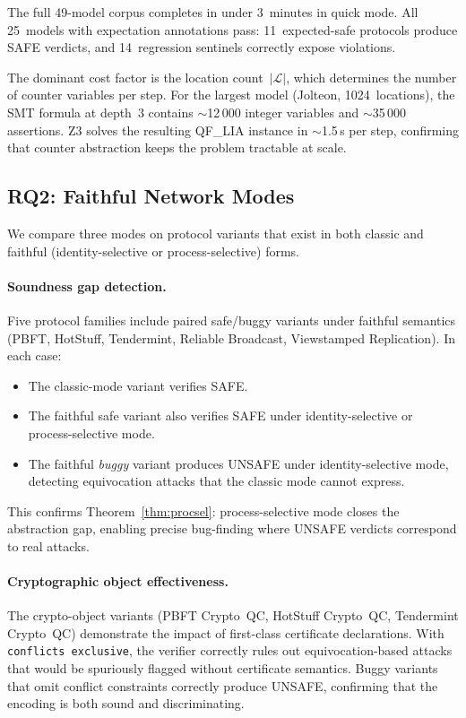The full 49-model corpus completes in under 3~minutes in quick mode.
All 25~models with expectation annotations pass: 11~expected-safe
protocols produce SAFE verdicts, and 14~regression sentinels correctly
expose violations.

The dominant cost factor is the location count~$|\mathcal{L}|$, which
determines the number of counter variables per step.  For the largest
model (Jolteon, 1024~locations), the SMT formula at depth~3 contains
${\sim}$12\,000 integer variables and ${\sim}$35\,000 assertions.
Z3 solves the resulting QF\_LIA instance in ${\sim}$1.5\,s per step,
confirming that counter abstraction keeps the problem tractable at
scale.

\subsection{RQ2: Faithful Network Modes}

We compare three modes on protocol variants that exist in both
classic and faithful (identity-selective or process-selective) forms.

\paragraph{Soundness gap detection.}
Five protocol families include paired safe/buggy variants under
faithful semantics (PBFT, HotStuff, Tendermint, Reliable Broadcast,
Viewstamped Replication).  In each case:
\begin{itemize}
  \item The classic-mode variant verifies SAFE.
  \item The faithful safe variant also verifies SAFE under
    identity-selective or process-selective mode.
  \item The faithful \emph{buggy} variant produces UNSAFE under
    identity-selective mode, detecting equivocation attacks that the
    classic mode cannot express.
\end{itemize}
This confirms Theorem~\ref{thm:procsel}: process-selective mode closes
the abstraction gap, enabling precise bug-finding where UNSAFE verdicts
correspond to real attacks.

\paragraph{Cryptographic object effectiveness.}
The crypto-object variants (PBFT Crypto~QC, HotStuff Crypto~QC,
Tendermint Crypto~QC) demonstrate the impact of first-class certificate
declarations.  With \texttt{conflicts exclusive}, the verifier
correctly rules out equivocation-based attacks that would be spuriously
flagged without certificate semantics.  Buggy variants that omit
conflict constraints correctly produce UNSAFE, confirming that the
encoding is both sound and discriminating.

